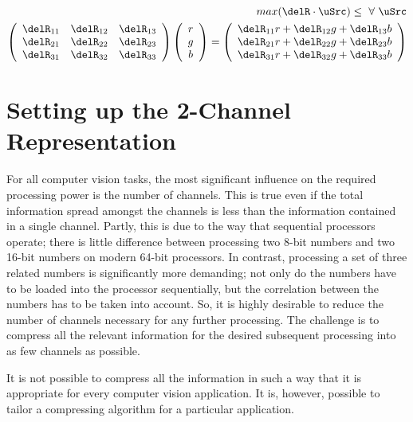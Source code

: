 \begin{eqnarray}\label{eq:allSrc}
\quad max(\delR \cdot \uSrc) \le ~\forall~\uSrc\\
\left(
\begin{array}{ccc}
\delR_{11} & \delR_{12} & \delR_{13}\\
\delR_{21} & \delR_{22} & \delR_{23}\\
\delR_{31} & \delR_{32} & \delR_{33}\\
\end{array}
\right)
\left(
\begin{array}{c}
r\\
g\\
b\\
\end{array}
\right) = \left(
\begin{array}{c}
\delR_{11}r + \delR_{12}g + \delR_{13}b\\
\delR_{21}r + \delR_{22}g + \delR_{23}b\\
\delR_{31}r + \delR_{32}g + \delR_{33}b\\
\end{array}
\right)
\end{eqnarray}

\section{Setting up the 2-Channel Representation}\label{sec:SettingUp2-ChannelRepresentation}

For all computer vision tasks, the most significant influence on the required processing power is the number of channels. This is true even if the total information spread amongst the channels is less than the information contained in a single channel. Partly, this is due to the way that sequential processors operate; there is little difference between processing two 8-bit numbers and two 16-bit numbers on modern 64-bit processors. In contrast, processing a set of three related numbers is significantly more demanding; not only do the numbers have to be loaded into the processor sequentially, but the correlation between the numbers has to be taken into account. So, it is highly desirable to reduce the number of channels necessary for any further processing. The challenge is to compress all the relevant information for the desired subsequent processing into as few channels as possible.

It is not possible to compress all the information in such a way that it is appropriate for every computer vision application. It is, however, possible to tailor a compressing algorithm for a particular application.


